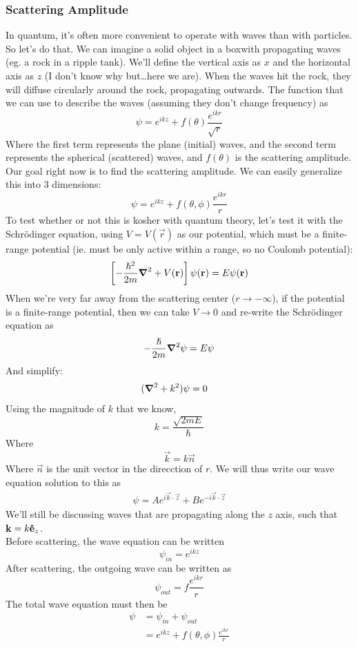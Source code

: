 \documentclass[a4paper]{article}
\begin{document}
\subsubsection{Scattering Amplitude}
In quantum, it's often more convenient to operate with waves than with
particles. So let's do that. We can imagine a solid object in a boxwith
propagating waves (eg. a rock in a ripple tank). We'll define the vertical axis
as $x$ and the horizontal axis as $z$ (I don't know why but\ldots here we are).
When the waves hit the rock, they will diffuse circularly around the rock,
propagating outwards. The function that we can use to describe the waves
(assuming they don't change frequency) as
\[
	\psi = e^{ikz} + f(\theta)\frac{e^{ikr}}{\sqrt{r}}
\]
Where the first term represents the plane (initial) waves, and the second term
represents the spherical (scattered) waves, and $f(\theta)$ is the scattering
amplitude. Our goal right now is to find the scattering amplitude. We can
easily generalize this into 3 dimensions:
\[
	\psi = e^{ikz} + f(\theta,\phi)\frac{e^{ikr}}{r}
\]
To test whether or not this is kosher with quantum theory, let's test it with
the Schr\"odinger equation, using $V = V(\vec{r})$ as our potential, which must
be a finite-range potential (ie. must be only active within a range, so no
Coulomb potential):
\[
	\left[-\frac{\hslash^2}{2m}\boldsymbol{\mathbf{\nabla}}^2+V(\boldsymbol{\mathbf{r}})\right]\psi(\boldsymbol{\mathbf{r}}) =
		E\psi(\boldsymbol{\mathbf{r}})
\]
When we're very far away from the scattering center ($r\to-\infty$), if the
potential is a finite-range potential, then we can take $V\to0$ and re-write
the Schr\"odinger equation as
\[
	-\frac{\hslash}{2m}\boldsymbol{\mathbf{\nabla}}^2\psi = E\psi
\]
And simplify:
\begin{align*}
	(\boldsymbol{\mathbf{\nabla}}^2+k^2)\psi &= 0
\end{align*}
Using the magnitude of $k$ that we know,
\[
	k = \frac{\sqrt{2mE}}{\hslash}
\]
Where
\[
	\vec{k} = k\vec{n}
\]
Where $\vec{n}$ is the unit vector in the direcction of $r$.
We will thus write our wave equation solution to this as
\begin{align*}
	\psi = A e^{i\vec{k}\cdot\vec{z}} + Be^{-i\vec{k}\cdot\vec{z}}
\end{align*}
We'll still be discussing waves that are propagating along the $z$ axis, such
that $\boldsymbol{\mathbf{k}} = k\boldsymbol{\mathbf{\hat{e}}}_z$.\\
Before scattering, the wave equation can be written
\[
	\psi_{in} = e^{ikz}
\]
After scattering, the outgoing wave can be written as
\[
	\psi_{out} = f\frac{e^{ikr}}{r}
\]
The total wave equation must then be
\begin{align*}
	\psi &= \psi_{in} + \psi_{out}\\
	&= e^{ikz} + f(\theta,\phi)\frac{e^{ikr}}{r}
\end{align*}
\end{document}
